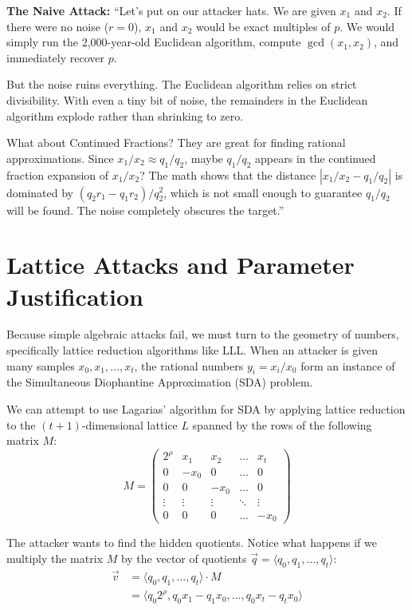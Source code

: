 \documentclass[11pt]{article}
\begin{document}
\begin{speakernote}
\textbf{The Naive Attack:}
``Let's put on our attacker hats. We are given $x_1$ and $x_2$. If there were no noise ($r = 0$), $x_1$ and $x_2$ would be exact multiples of $p$. We would simply run the 2,000-year-old Euclidean algorithm, compute $\gcd(x_1, x_2)$, and immediately recover $p$. 

But the noise ruins everything. The Euclidean algorithm relies on strict divisibility. With even a tiny bit of noise, the remainders in the Euclidean algorithm explode rather than shrinking to zero. 

What about Continued Fractions? They are great for finding rational approximations. Since $x_1/x_2 \approx q_1/q_2$, maybe $q_1/q_2$ appears in the continued fraction expansion of $x_1/x_2$? The math shows that the distance $|x_1/x_2 - q_1/q_2|$ is dominated by $(q_2 r_1 - q_1 r_2)/q_2^2$, which is not small enough to guarantee $q_1/q_2$ will be found. The noise completely obscures the target.''
\end{speakernote}

\section{Lattice Attacks and Parameter Justification}

Because simple algebraic attacks fail, we must turn to the geometry of numbers, specifically lattice reduction algorithms like LLL. When an attacker is given many samples $x_0, x_1, \dots, x_t$, the rational numbers $y_i = x_i / x_0$ form an instance of the Simultaneous Diophantine Approximation (SDA) problem. 

We can attempt to use Lagarias' algorithm for SDA by applying lattice reduction to the $(t+1)$-dimensional lattice $L$ spanned by the rows of the following matrix $M$:
\begin{equation}
M = 
\begin{pmatrix}
2^\rho & x_1 & x_2 & \dots & x_t \\
0 & -x_0 & 0 & \dots & 0 \\
0 & 0 & -x_0 & \dots & 0 \\
\vdots & \vdots & \vdots & \ddots & \vdots \\
0 & 0 & 0 & \dots & -x_0
\end{pmatrix}
\end{equation}

The attacker wants to find the hidden quotients. Notice what happens if we multiply the matrix $M$ by the vector of quotients $\vec{q} = \langle q_0, q_1, \dots, q_t \rangle$:
\begin{align}
\vec{v} &= \langle q_0, q_1, \dots, q_t \rangle \cdot M \\
&= \langle q_0 2^\rho, q_0 x_1 - q_1 x_0, \dots, q_0 x_t - q_t x_0 \rangle
\end{align}
\end{document}

